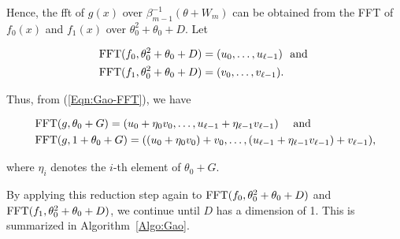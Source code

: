 Hence, the \gls{fft} of $g(x)$ over $\beta_{m-1}^{-1}(\theta+W_m)$ can be obtained from the FFT of $f_0(x)$ and $f_1(x)$ over $\theta_0^2+\theta_0+D$. Let 

\begin{equation*}
	\begin{aligned}
		&\operatorname{FFT}(f_0,\theta_0^2+\theta_0+D)=(u_0,\ldots,u_{\ell-1})~\text{ and }\\
		&\operatorname{FFT}(f_1,\theta_0^2+\theta_0+D)=(v_0,\ldots,v_{\ell-1}).
	\end{aligned}
\end{equation*}

Thus, from (\ref{Eqn:Gao-FFT}), we have

\begin{equation*}
	\begin{aligned}
		&\operatorname{FFT}(g,\theta_0+G)=(u_0+\eta_{0}v_{0},\ldots,u_{\ell-1}+\eta_{\ell-1} v_{\ell-1}) \quad \text{ and}\\
		&\operatorname{FFT}(g,1+\theta_0+G)=((u_0+\eta_{0}v_{0})+v_0,\ldots,(u_{\ell-1}+\eta_{\ell-1} v_{\ell-1})+v_{\ell-1}),
	\end{aligned}
\end{equation*}

where $\eta_{i}$ denotes the $i$-th element of $\theta_0+G$.

By applying this reduction step again to $\operatorname{FFT}(f_0,\theta_0^2+\theta_0+D)$ and $\operatorname{FFT}(f_1,\theta_0^2+\theta_0+D)$, we continue until $D$ has a dimension of 1. This is summarized in Algorithm~\ref{Algo:Gao}.

